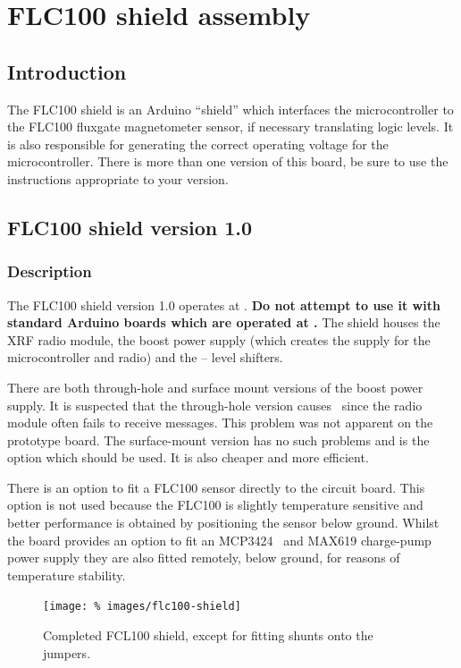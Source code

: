 \chapter{FLC100 shield assembly}

\section{Introduction}
The FLC100 shield is an Arduino ``shield'' which interfaces the
microcontroller to the FLC100 fluxgate magnetometer sensor, if
necessary translating logic levels. It is also responsible for
generating the correct operating voltage for the
microcontroller. There is more than one version of this board, be sure
to use the instructions appropriate to your version.

\section{FLC100 shield version 1.0}

\subsection{Description}

The FLC100 shield version 1.0 operates at . \textbf{Do not
  attempt to use it with standard Arduino boards which are operated at
  .} The shield houses the XRF radio module, the boost power
supply (which creates the  supply for the microcontroller
and radio) and the  --  level shifters.

There are both through-hole and surface mount versions of the boost
power supply. It is suspected that the through-hole version causes
\rfi\ since the radio module often fails to receive messages. This
problem was not apparent on the prototype board. The surface-mount
version has no such problems and is the option which should be
used. It is also cheaper and more efficient.

There is an option to fit a FLC100 sensor directly to the circuit
board. This option is not used because the FLC100 is slightly
temperature sensitive and better performance is obtained by
positioning the sensor below ground. Whilst the board provides an
option to fit an MCP3424 \adc\ and MAX619 charge-pump power supply they
are also fitted remotely, below ground, for reasons of temperature
stability.


\begin{figure}
  \centering
  \texttt{[image: \%
    images/flc100-shield]}
  \caption[Completed FLC100 shield]{Completed FCL100 shield, except
    for fitting shunts onto the jumpers. %
    }
  \label{fig:flc100-v1.0}
\end{figure}

